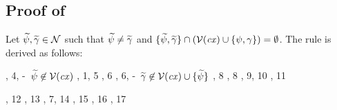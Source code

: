 \subsection*{Proof of }

Let $\widetilde{\psi},\widetilde{\gamma}\in\mathcal{N}$ such that $\widetilde{\psi}\neq\widetilde{\gamma}$ and
$\{\widetilde{\psi},\widetilde{\gamma}\}\cap(\mathcal{V}(\mathit{cx})\cup\{\psi,\gamma\})=
\emptyset$. The rule is derived as follows:
\begin{derivation}
\step{\istyO{\typ}}{\hyp}
\step{\cxwf{\snoc{\cx}{\vdec{\varFXpred}{\tarr{\typ}{\bool}}}}}
     {\RcxvdecI, 4, \hyp\ $\widetilde{\psi}\not\in\mathcal{V}(\mathit{cx})$}
\step{\isty{\snoc{\cx}{\vdec{\varFXpred}{\tarr{\typ}{\bool}}}}{\typ}}
     {, 1, 5}
\step{\hasty{\snoc{\cx}{\vdec{\varFXpred}{\tarr{\typ}{\bool}}}}
            {\faopO}{\tarr{(\tarr{\typ}{\bool})}{\bool}}}
     {\Refaop, 6}
\step{\cxwf{\snoc{\snoc{\cx}
             {\vdec{\varFXpred}{\tarr{\typ}{\bool}}}}{\vdec{\varFX}{\typ}}}}
     {\RcxvdecI, 6, \hyp\ $\widetilde{\gamma}\not\in\mathcal{V}(\mathit{cx})\cup\{\widetilde{\psi}\}$}
\step{\hasty{\snoc{\snoc{\cx}
              {\vdec{\varFXpred}{\tarr{\typ}{\bool}}}}{\vdec{\varFX}{\typ}}}
            {\varFXpred}{\tarr{\typ}{\bool}}}
     {\Revar, 8}
\step{\hasty{\snoc{\snoc{\cx}
              {\vdec{\varFXpred}{\tarr{\typ}{\bool}}}}{\vdec{\varFX}{\typ}}}
            {\varFX}{\typ}}
     {\Revar, 8}
\step{\hasty{\snoc{\snoc{\cx}
              {\vdec{\varFXpred}{\tarr{\typ}{\bool}}}}{\vdec{\varFX}{\typ}}}
            {\app{\varFXpred}{\varFX}}{\bool}}
     {\Reapp, 9, 10}
\step{\hasty{\snoc{\snoc{\cx}
              {\vdec{\varFXpred}{\tarr{\typ}{\bool}}}}{\vdec{\varFX}{\typ}}}
            {\nega{(\app{\varFXpred}{\varFX})}}{\bool}}
     {\Renega, 11}

\step{\hasty{\snoc{\cx}{\vdec{\varFXpred}{\tarr{\typ}{\bool}}}}
            {\abs{\varFX}{\typ}{\nega{(\app{\varFXpred}{\varFX})}}}
            {\tarr{\typ}{\bool}}}
     {\Reabs, 12}
\step{\hasty{\snoc{\cx}{\vdec{\varFXpred}{\tarr{\typ}{\bool}}}}
            {\abs{\varfx}{\typ}{\nega{(\app{\varFXpred}{\varfx})}}}
            {\tarr{\typ}{\bool}}}
     {\Reabsalpha, 13}
\step{\hasty{\snoc{\cx}{\vdec{\varFXpred}{\tarr{\typ}{\bool}}}}
            {\fa{\varfx}{\typ}{\nega{(\app{\varFXpred}{\varfx})}}}
            {\bool}}
     {\Reapp, 7, 14}
\step{\hasty{\snoc{\cx}{\vdec{\varFXpred}{\tarr{\typ}{\bool}}}}
            {\nega{(\fa{\varfx}{\typ}{\nega{(\app{\varFXpred}{\varfx})}})}}
            {\bool}}
     {\Renega, 15}
\step{\hastyO{\abs{\varFXpred}{\tarr{\typ}{\bool}}
                  {\nega{(\fa{\varfx}{\typ}
                             {\nega{(\app{\varFXpred}{\varfx})}})}}}
             {\tarr{(\tarr{\typ}{\bool})}{\bool}}}
     {\Reabs, 16}
\step{\hastyO{\abs{\varfxpred}{\tarr{\typ}{\bool}}
                  {\nega{(\fa{\varfx}{\typ}
                             {\nega{(\app{\varfxpred}{\varfx})}})}}}
             {\tarr{(\tarr{\typ}{\bool})}{\bool}}}
     {\Reabsalpha, 17}
\end{derivation}



